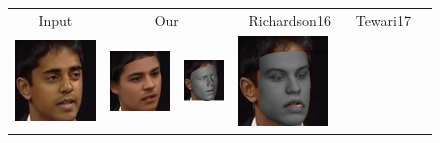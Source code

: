 \begin{figure}[t!]
\begin{center}
\small
\setlength{\tabcolsep}{3pt}
\begin{tabular}{c@{\hskip 1.5mm}c@{\hskip 1mm}c@{\hskip 1.5mm}c@{\hskip 1mm}c@{\hskip 1.5mm}c@{\hskip 1mm}c@{\hskip 1mm}c@{}}
Input & \multicolumn{2}{c}{Our}  & \multicolumn{2}{c}{Richardson16} & \multicolumn{2}{c}{Tewari17} \\
\includegraphics[width=\FittingFigWid]{img/Random/300VW_1_in.png} &
\includegraphics[width=\FittingFigWid]{img/Random/300VW_1_rescon.png} &
\includegraphics[width=\FittingFigWid]{img/Random/300VW_1_shape.png} &
\includegraphics[width=\FittingFigWid]{img/Random/300VW_1_Richardson_rescon.png} &

\end{tabular}
\end{center}
\end{figure}
